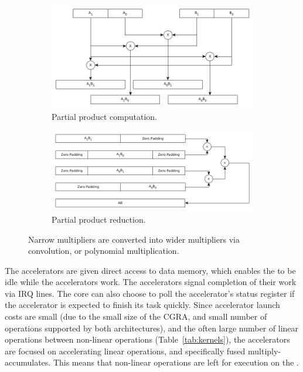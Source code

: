 \begin{figure}
\centering
\begin{subfigure}{\linewidth}
    \includegraphics[width=\linewidth]{./figs/poly_mul.png}
    \caption{Partial product computation.}
    \label{fig:poly_mul_pp}
\end{subfigure}

\begin{subfigure}{\linewidth}
    \includegraphics[width=\linewidth]{./figs/poly_mul_reduction.png}
    \caption{Partial product reduction.}
    \label{fig:poly_mul_red}
\end{subfigure}
\caption{Narrow multipliers are converted into wider multipliers via
convolution, or polynomial multiplication.}
\label{fig:poly_mul}
\end{figure}

The accelerators are given direct access to data memory, which enables the
\mcu{} to be idle while the accelerators work.  The accelerators signal
completion of their work via IRQ lines.  The core can also choose to poll the
accelerator's status register if the accelerator is expected to finish its task
quickly.  Since accelerator launch costs are small (due to the small size of
the CGRA, and small number of operations supported by both architectures), and
the often large number of linear operations between non-linear operations
(Table~\ref{tab:kernels}), the accelerators are focused on accelerating linear
operations, and specifically fused multiply-accumulates.  This means that
non-linear operations are left for execution on the \mcu{}.

